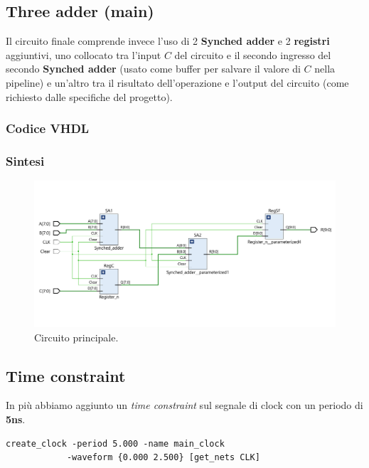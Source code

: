 \documentclass[12pt]{article}
\begin{document}
    \subsection{Three adder (main)}
        Il circuito finale comprende invece l'uso di 2 \textbf{Synched adder} e 2 \textbf{registri} aggiuntivi, uno collocato tra l'input $C$ del circuito e il secondo ingresso del secondo \textbf{Synched adder} (usato come buffer per salvare il valore di $C$ nella pipeline) e un'altro tra il risultato dell'operazione e l'output del circuito (come richiesto dalle specifiche del progetto).

        \subsubsection{Codice VHDL}
            
        \newpage
        
        \subsubsection{Sintesi}
            \begin{figure}[ht]
                \centering
                \includegraphics[scale=0.55]{main.png}
                \caption{Circuito principale.}
            \end{figure}

    \subsection{Time constraint}
        In più abbiamo aggiunto un \textit{time constraint} sul segnale di clock con un periodo di \textbf{5ns}.

        \begin{lstlisting}[basicstyle=\footnotesize]
            create_clock -period 5.000 -name main_clock
            -waveform {0.000 2.500} [get_nets CLK]
        \end{lstlisting}
\end{document}
